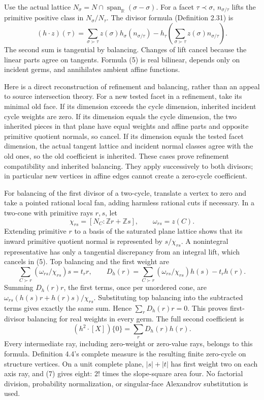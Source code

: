 \documentclass[
  11pt,
]{article}
\begin{document}
Use the actual lattice
\(N_\sigma=N\cap\operatorname{span}_{\mathbb R}(\sigma-\sigma)\). For a
facet \(\tau\prec\sigma\), \(n_{\sigma/\tau}\) lifts the primitive
positive class in \(N_\sigma/N_\tau\). The divisor formula (Definition
2.31) is \[
 (h\cdot z)(\tau)=\sum_{\sigma\succ\tau}z(\sigma)h_\sigma(n_{\sigma/\tau})
       -h_\tau\left(\sum_{\sigma\succ\tau}z(\sigma)n_{\sigma/\tau}\right).
                                                               \tag{5}
\] The second sum is tangential by balancing. Changes of lift cancel
because the linear parts agree on tangents. Formula (5) is real
bilinear, depends only on incident germs, and annihilates ambient affine
functions.

Here is a direct reconstruction of refinement and balancing, rather than
an appeal to source intersection theory. For a new tested facet in a
refinement, take its minimal old face. If its dimension exceeds the
cycle dimension, inherited incident cycle weights are zero. If its
dimension equals the cycle dimension, the two inherited pieces in that
plane have equal weights and affine parts and opposite primitive
quotient normals, so cancel. If its dimension equals the tested facet
dimension, the actual tangent lattice and incident normal classes agree
with the old ones, so the old coefficient is inherited. These cases
prove refinement compatibility and inherited balancing. They apply
successively to both divisors; in particular new vertices in affine
edges cannot create a zero-cycle coefficient.

For balancing of the first divisor of a two-cycle, translate a vertex to
zero and take a pointed rational local fan, adding harmless rational
cuts if necessary. In a two-cone with primitive rays \(r,s\), let \[
 \chi_{rs}=[N_C:\mathbb Zr+\mathbb Zs],\qquad \omega_{rs}=z(C).
\] Extending primitive \(r\) to a basis of the saturated plane lattice
shows that its inward primitive quotient normal is represented by
\(s/\chi_{rs}\). A nonintegral representative has only a tangential
discrepancy from an integral lift, which cancels in (5). Top balancing
and the first weight are \[
 \sum_{C\succ r}(\omega_{rs}/\chi_{rs})s=t_r r,
 \qquad D_h(r)=\sum_{C\succ r}(\omega_{rs}/\chi_{rs})h(s)-t_rh(r). \tag{6}
\] Summing \(D_h(r)r\), the first terms, once per unordered cone, are
\(\omega_{rs}(h(s)r+h(r)s)/\chi_{rs}\). Substituting top balancing into
the subtracted terms gives exactly the same sum. Hence
\(\sum_rD_h(r)r=0\). This proves first-divisor balancing for real
weights in every germ. The full second coefficient is \[
                       (h^2\cdot[X])\{0\}=\sum_rD_h(r)h(r).     \tag{7}
\] Every intermediate ray, including zero-weight or zero-value rays,
belongs to this formula. Definition 4.4's complete measure is the
resulting finite zero-cycle on structure vertices. On a unit complete
plane, \(|s|+|t|\) has first weight two on each axis ray, and (7) gives
eight: \(2!\) times the slope-square area four. No factorial division,
probability normalization, or singular-face Alexandrov substitution is
used.
\end{document}
